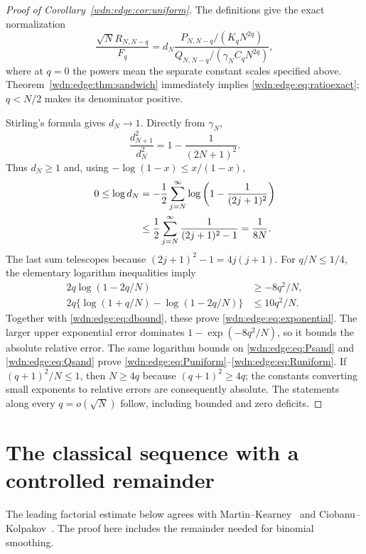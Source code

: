 \documentclass[11pt,letterpaper]{article}
\theoremstyle{remark}\newtheorem{remark}[theorem]{Remark}
\begin{document}
\begin{proof}[Proof of Corollary~\ref{wdn:edge:cor:uniform}]
The definitions give the exact normalization
\[
 \frac{\sqrt N R_{N,N-q}}{F_q}
 =d_N\frac{P_{N,N-q}/(K_qN^{2q})}
              {Q_{N,N-q}/(\gamma_N C_qN^{2q})},
\]
where at $q=0$ the powers mean the separate constant scales specified
above. Theorem~\ref{wdn:edge:thm:sandwich} immediately implies
\eqref{wdn:edge:eq:ratioexact}; $q<N/2$ makes its denominator positive.

Stirling's formula gives $d_N\to1$. Directly from $\gamma_N$,
\[
 \frac{d_{N+1}^2}{d_N^2}=1-\frac1{(2N+1)^2}.
\]
Thus $d_N\ge1$ and, using $-\log(1-x)\le x/(1-x)$,
\begin{align}\label{wdn:edge:eq:dbound}
 0\le\log d_N
 &=-\frac12\sum_{j=N}^{\infty}\log\left(1-\frac1{(2j+1)^2}\right)\notag\\
 &\le\frac12\sum_{j=N}^{\infty}\frac1{(2j+1)^2-1}
 =\frac1{8N}.
\end{align}
The last sum telescopes because $(2j+1)^2-1=4j(j+1)$.
For $q/N\le1/4$, the elementary logarithm inequalities imply
\begin{align*}
 2q\log(1-2q/N)&\ge-8q^2/N,\\
 2q\{\log(1+q/N)-\log(1-2q/N)\}&\le10q^2/N.
\end{align*}
Together with \eqref{wdn:edge:eq:dbound}, these prove \eqref{wdn:edge:eq:exponential}.
The larger upper exponential error dominates
$1-\exp(-8q^2/N)$, so it bounds the absolute relative error.
The same logarithm bounds on \eqref{wdn:edge:eq:Psand} and \eqref{wdn:edge:eq:Qsand}
prove \eqref{wdn:edge:eq:Puniform}--\eqref{wdn:edge:eq:Runiform}. If $(q+1)^2/N\le1$,
then $N\ge4q$ because $(q+1)^2\ge4q$; the constants converting small
exponents to relative errors are consequently absolute. The statements
along every $q=o(\sqrt N)$ follow, including bounded and zero deficits.
\end{proof}

\section{The classical sequence with a controlled remainder}\label{wdn:edge:sec:classical}
The leading factorial estimate below agrees with
Martin--Kearney~\cite[Section~2.4, Theorem~3]{MK} and
Ciobanu--Kolpakov~\cite[Theorem~4.1 and Examples~4.4, 5.3]{CK}.
The proof here includes the remainder needed for binomial smoothing.
\end{document}
